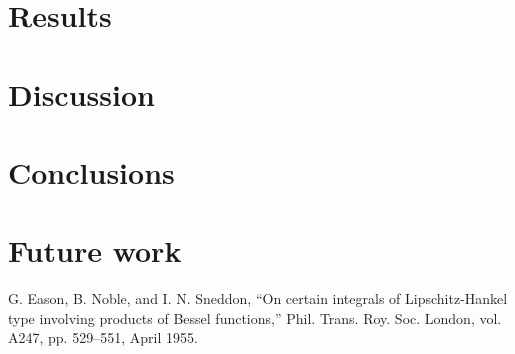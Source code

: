\documentclass[conference]{IEEEtran}
\begin{document}
\section{Results}
\section{Discussion}
\section{Conclusions}
\section{Future work}

\begin{thebibliography}{00}
 G. Eason, B. Noble, and I. N. Sneddon, ``On certain integrals of Lipschitz-Hankel type involving products of Bessel functions,'' Phil. Trans. Roy. Soc. London, vol. A247, pp. 529--551, April 1955.
\end{thebibliography}
\end{document}
